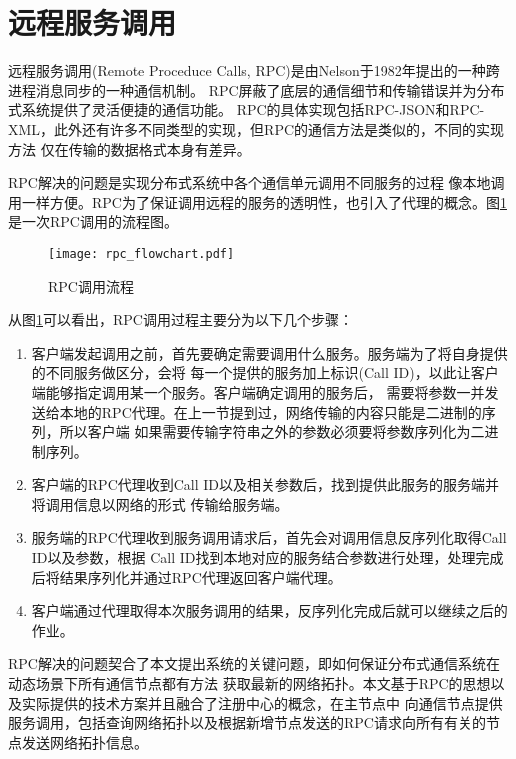 \section{远程服务调用}
远程服务调用(Remote Proceduce Calls, RPC)是由Nelson于1982年提出的一种跨进程消息同步的一种通信机制\cite{Andrew}。
RPC屏蔽了底层的通信细节和传输错误并为分布式系统提供了灵活便捷的通信功能。
RPC的具体实现包括RPC-JSON和RPC-XML\cite{2011TOWARD,2013Web}，此外还有许多不同类型的实现，但RPC的通信方法是类似的，不同的实现方法
仅在传输的数据格式本身有差异。

RPC解决的问题是实现分布式系统中各个通信单元调用不同服务的过程
像本地调用一样方便。RPC为了保证调用远程的服务的透明性，也引入了代理的概念\cite{5694349}。图\ref{rpc_flowchart}是一次RPC调用的流程图。
\begin{figure}[H]
  \centering
  \texttt{[image: rpc\_flowchart.pdf]}
  \caption{RPC调用流程}
  \label{rpc_flowchart}
\end{figure}
从图\ref{rpc_flowchart}可以看出，RPC调用过程主要分为以下几个步骤：
\begin{enumerate}
  \item 客户端发起调用之前，首先要确定需要调用什么服务。服务端为了将自身提供的不同服务做区分，会将
  每一个提供的服务加上标识(Call ID)，以此让客户端能够指定调用某一个服务。客户端确定调用的服务后，
  需要将参数一并发送给本地的RPC代理。在上一节提到过，网络传输的内容只能是二进制的序列，所以客户端
  如果需要传输字符串之外的参数必须要将参数序列化为二进制序列。
  \item 客户端的RPC代理收到Call ID以及相关参数后，找到提供此服务的服务端并将调用信息以网络的形式
  传输给服务端。
  \item 服务端的RPC代理收到服务调用请求后，首先会对调用信息反序列化取得Call ID以及参数，根据
  Call ID找到本地对应的服务结合参数进行处理，处理完成后将结果序列化并通过RPC代理返回客户端代理。
  \item 客户端通过代理取得本次服务调用的结果，反序列化完成后就可以继续之后的作业。
\end{enumerate}

RPC解决的问题契合了本文提出系统的关键问题，即如何保证分布式通信系统在动态场景下所有通信节点都有方法
获取最新的网络拓扑。本文基于RPC的思想以及实际提供的技术方案并且融合了注册中心的概念，在主节点中
向通信节点提供服务调用，包括查询网络拓扑以及根据新增节点发送的RPC请求向所有有关的节点发送网络拓扑信息。

